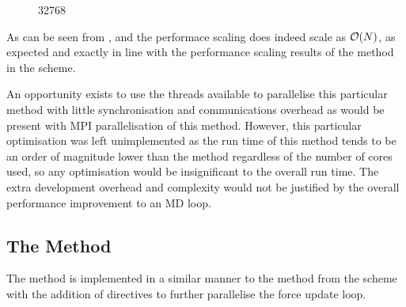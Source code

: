 \begin{figure}[!h]
    
    \caption{
        \vOneSRTimeCaption
            {\sharedandreplicateddata{}}
            {\individualoperation{}}
            {32768}
    }
    \label{fig:v1_shared_and_replicated_individual_operation_32768_time}
\end  {figure}

\vOneSRTimeExplanation
    {}
    {}
    {}
    {\individualoperation{}}
    {\replicateddata{}}


%
As can be seen from 
,
 and
the performace scaling does indeed scale as $\mathcal{O}{\left({ N }\right)}$, as expected
and exactly in line with the performance scaling results of the
\individualoperation{} method in the \replicateddata{} scheme.

An opportunity exists to use the \openmp{} threads available to
parallelise this particular method with little synchronisation
and communications overhead as would be present with MPI
parallelisation of this method.
%
However, this particular optimisation was left unimplemented as
the run time of this method tends to be an order of magnitude
lower than the \pairoperation{} method regardless of the
number of cores used, so any optimisation
would be insignificant to the overall run time.
%
The extra development overhead and complexity would not be justified by the
overall performance improvement to an MD loop.



\subsection{The \pairoperation{} Method}

The \pairoperation{} method is implemented in a similar manner to the
\pairoperation{} method from the \replicateddata{} scheme with the
addition of \openmp{} directives to further parallelise the
force update loop.

%

